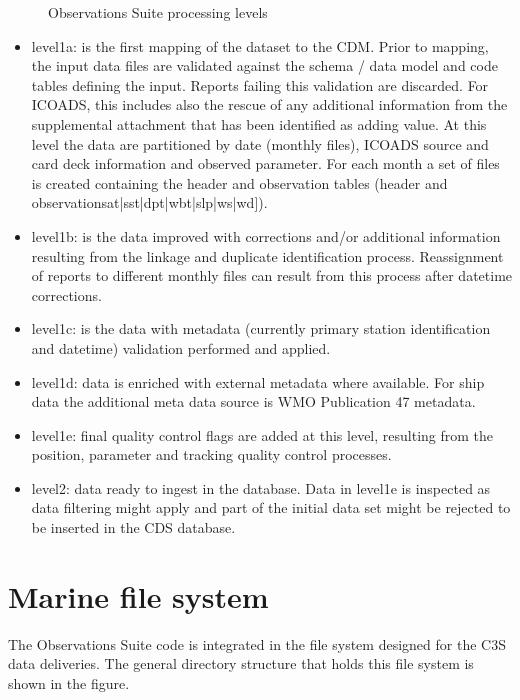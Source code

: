 \documentclass[letterpaper,10pt,english]{sphinxmanual}
\let\sphinxpxdimen\pdfpxdimen\else\newdimen\sphinxpxdimen
\begin{document}
\begin{figure}[htbp]
\centering
\capstart

\noindent\sphinxincludegraphics[width=500\sphinxpxdimen]{{obs_suite_levels}.png}
\caption{Observations Suite processing levels}\label{\detokenize{index:id4}}\end{figure}
\begin{itemize}
\item {} 
level1a: is the first mapping of the dataset to the CDM. Prior to mapping,
the input data files are validated against the schema / data model and code
tables defining the input. Reports failing this validation are discarded. For
ICOADS, this includes also the rescue of any additional information from the
supplemental attachment that has been identified as adding value. At this
level the data are partitioned by date (monthly files), ICOADS source and card
deck information and observed parameter. For each month a set of files is
created containing the header and observation tables (header and
observations\sphinxhyphen{}{[}at|sst|dpt|wbt|slp|ws|wd{]}).

\item {} 
level1b: is the data improved with corrections and/or additional information
resulting from the linkage and duplicate identification process. Reassignment of
reports to different monthly files can result from this process after datetime
corrections.

\item {} 
level1c: is the data with metadata (currently primary station identification
and datetime) validation performed and applied.

\item {} 
level1d: data is enriched with external meta\sphinxhyphen{}data where available. For ship
data the additional meta data source is WMO Publication 47 metadata.

\item {} 
level1e: final quality control flags are added at this level, resulting from
the position, parameter and tracking quality control processes.

\item {} 
level2: data ready to ingest in the database. Data in level1e is inspected as
data filtering might apply and part of the initial data set might be rejected
to be inserted in the CDS database.

\end{itemize}


\chapter{Marine file system}
\label{\detokenize{index:marine-file-system}}
The Observations Suite code is integrated in the file system designed for the
C3S data deliveries. The general directory structure that holds this file system
is shown in the figure.
\end{document}

